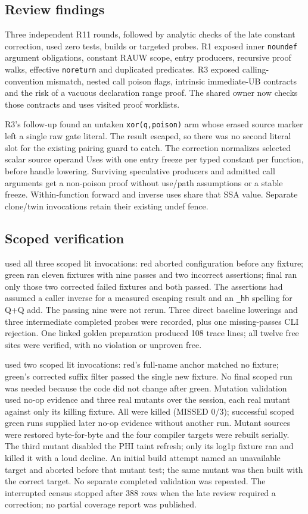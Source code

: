 \subsection*{Review findings}
Three independent R11 rounds, followed by analytic checks of the late constant
correction, used zero tests, builds or targeted probes. R1 exposed inner
\texttt{noundef} argument obligations, constant RAUW scope, entry producers,
recursive proof walks, effective \texttt{noreturn} and duplicated predicates.
R3 exposed calling-convention mismatch, nested call poison flags, intrinsic
immediate-UB contracts and the risk of a vacuous declaration range proof.
The shared owner now checks those contracts and uses visited proof worklists.

R3's follow-up found an untaken \texttt{xor(q,poison)} arm whose erased source
marker left a single raw gate literal. The result escaped, so there was no
second literal slot for the existing pairing guard to catch. The correction
normalizes selected scalar source operand Uses with one entry freeze per typed
constant per function, before handle lowering. Surviving speculative producers
and admitted call arguments get a non-poison proof without use/path assumptions
or a stable freeze. Within-function forward and inverse uses share that SSA
value. Separate clone/twin invocations retain their existing undef fence.

\subsection*{Scoped verification}
 used all three scoped lit invocations: red aborted configuration
before any fixture; green ran eleven fixtures with nine passes and two incorrect
assertions; final ran only those two corrected failed fixtures and both passed.
The assertions had assumed a caller inverse for a measured escaping result and
an \texttt{\_hh} spelling for Q+Q add. The passing nine were not rerun.
Three direct baseline lowerings and three intermediate completed probes were
recorded, plus one missing-passes CLI rejection. One linked golden preparation
produced 108 trace lines; all twelve free sites were verified, with no violation
or unproven free.

 used two scoped lit invocations: red's full-name anchor matched
no fixture; green's corrected suffix filter passed the single new fixture.
No final scoped run was needed because the code did not change after green.
Mutation validation used no-op evidence and three real mutants over the session, each
real mutant against only its killing fixture. All were killed (MISSED 0/3);
successful scoped green runs supplied later no-op evidence without another run.
Mutant sources were restored byte-for-byte and the four compiler targets were
rebuilt serially. The third mutant disabled the PHI taint refresh; only its
log1p fixture ran and killed it with a loud decline. An initial build attempt
named an unavailable target and aborted before that mutant test; the same
mutant was then built with the correct target. No separate completed  validation was repeated.
The interrupted census stopped after 388 rows when the late review required a
correction; no partial coverage report was published.


